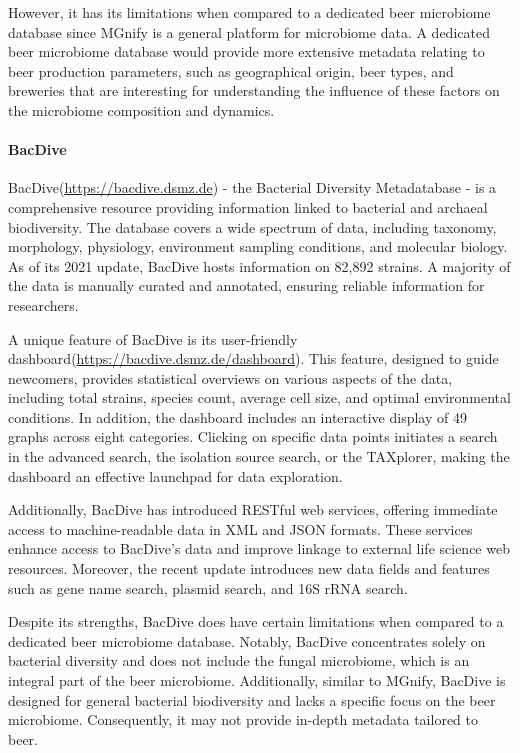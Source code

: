             However, it has its limitations when compared to a dedicated beer microbiome database since MGnify is a general platform for microbiome data. A dedicated beer microbiome database would provide more extensive metadata relating to beer production parameters, such as geographical origin, beer types, and breweries that are interesting for understanding the influence of these factors on the microbiome composition and dynamics.
            
        \paragraph*{BacDive}
            BacDive(\url{https://bacdive.dsmz.de}) - the Bacterial Diversity Metadatabase - is a comprehensive resource providing information linked to bacterial and archaeal biodiversity. The database covers a wide spectrum of data, including taxonomy, morphology, physiology, environment sampling conditions, and molecular biology. As of its 2021 update, BacDive hosts information on 82,892 strains. A majority of the data is manually curated and annotated, ensuring reliable information for researchers\cite{reimer2022bac}.

            A unique feature of BacDive is its user-friendly dashboard(\url{https://bacdive.dsmz.de/dashboard}). This feature, designed to guide newcomers, provides statistical overviews on various aspects of the data, including total strains, species count, average cell size, and optimal environmental conditions. In addition, the dashboard includes an interactive display of 49 graphs across eight categories. Clicking on specific data points initiates a search in the advanced search, the isolation source search, or the TAXplorer, making the dashboard an effective launchpad for data exploration.

            Additionally, BacDive has introduced RESTful web services, offering immediate access to machine-readable data in XML and JSON formats. These services enhance access to BacDive's data and improve linkage to external life science web resources. Moreover, the recent update introduces new data fields and features such as gene name search, plasmid search, and 16S rRNA search.

             Despite its strengths, BacDive does have certain limitations when compared to a dedicated beer microbiome database. Notably, BacDive concentrates solely on bacterial diversity and does not include the fungal microbiome, which is an integral part of the beer microbiome. Additionally, similar to MGnify, BacDive is designed for general bacterial biodiversity and lacks a specific focus on the beer microbiome. Consequently, it may not provide in-depth metadata tailored to beer.


